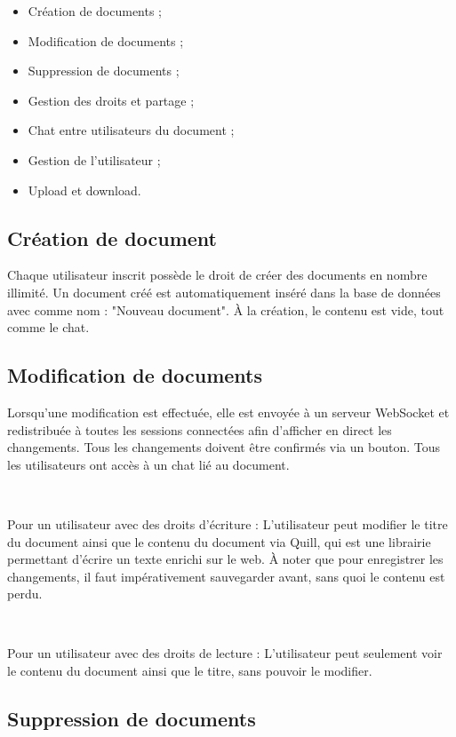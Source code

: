 \documentclass[a4paper, 12pt]{article}
\begin{document}
	\begin{itemize}
		\item Création de documents ;
		\item Modification de documents ;
		\item Suppression de documents ;
		\item Gestion des droits et partage ;
		\item Chat entre utilisateurs du document ;
		\item Gestion de l'utilisateur ;
		\item Upload et download.
	\end{itemize}
	
	\subsection{Création de document}
	
	Chaque utilisateur inscrit possède le droit de créer des documents en nombre illimité. Un document créé est automatiquement inséré dans la base de données avec comme nom : "Nouveau document". À la création, le contenu est vide, tout comme le chat.
	
	\subsection{Modification de documents}
	
	Lorsqu'une modification est effectuée, elle est envoyée à un serveur WebSocket et redistribuée à toutes les sessions connectées afin d'afficher en direct les changements.
	Tous les changements doivent être confirmés via un bouton.
	Tous les utilisateurs ont accès à un chat lié au document.
	
	~
	
	Pour un utilisateur avec des droits d'écriture :
	L'utilisateur peut modifier le titre du document ainsi que le contenu du document via Quill, qui est une librairie permettant d'écrire un texte enrichi sur le web.
	À noter que pour enregistrer les changements, il faut impérativement sauvegarder avant, sans quoi le contenu est perdu.
	
	~
	
	Pour un utilisateur avec des droits de lecture :
	L'utilisateur peut seulement voir le contenu du document ainsi que le titre, sans pouvoir le modifier.
	
	\subsection{Suppression de documents}
	
\end{document}
